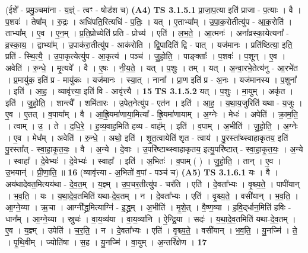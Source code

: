 \documentclass[17pt]{extarticle}
\begin{document}
                  \newline
                      (ईशे᳚ - प्रमु॒ञ्चमा॑ना - य॒ज्ञ्ं - त्वꣳ - षोड॑श च)  \textbf{(A4)} \newline \newline
                                \textbf{ TS 3.1.5.1} \newline
                  प्रा॒जा॒प॒त्या इति॑ प्राजा - प॒त्याः । वै । प॒शवः॑ । तेषा᳚म् । रु॒द्रः । अधि॑पति॒रित्यधि॑ - प॒तिः॒ । यत् । ए॒ताभ्या᳚म् । उ॒पा॒क॒रोतीत्यु॑प - आ॒क॒रोति॑ । ताभ्या᳚म् । ए॒व । ए॒न॒म् । प्र॒ति॒प्रोच्येति॑ प्रति - प्रोच्य॑ । एति॑ । ल॒भ॒ते॒ । आ॒त्मनः॑ । अना᳚व्रस्का॒येत्यना᳚ - व्र॒स्का॒य॒ । द्वाभ्या᳚म् । उ॒पाक॑रा॒तीत्यु॑प - आक॑रोति । द्वि॒पादिति॑ द्वि - पात् । यज॑मानः । प्रति॑ष्ठित्या॒ इति॒ प्रति॑ - स्थि॒त्यै॒ । उ॒पा॒कृत्येत्यु॑प - आ॒कृत्य॑ । पञ्च॑ । जु॒हो॒ति॒ । पाङ्क्ताः᳚ । प॒शवः॑ । प॒शून् । ए॒व । अवेति॑ । रु॒न्धे॒ । मृ॒त्यवे᳚ । वै । ए॒षः । नी॒य॒ते॒ । यत् । प॒शुः । तम् । यत् । अ॒न्वा॒रभे॒तेत्य॑नु - आ॒रभे॑त । प्र॒मायु॑क॒ इति॑ प्र - मायु॑कः । यज॑मानः । स्या॒त् । नाना᳚ । प्रा॒ण इति॑ प्र - अ॒नः । यज॑मानस्य । प॒शुना᳚ । इति॑ । आ॒ह॒ । व्यावृ॑त्त्या॒ इति॑ वि - आवृ॑त्त्यै । \textbf{  15} \newline
                  \newline
                                \textbf{ TS 3.1.5.2} \newline
                  यत् । प॒शुः । मा॒युम् । अकृ॑त । इति॑ । जु॒हो॒ति॒ । शान्त्यै᳚ । शमि॑तारः । उ॒पेत॒नेत्यु॑प - एत॑न । इति॑ । आ॒ह॒ । य॒था॒य॒जुरिति॑ यथा - य॒जुः । ए॒व । ए॒तत् । व॒पाया᳚म् । वै । आ॒ह्रि॒यमा॑णाया॒मित्या᳚ - ह्रि॒यमा॑णायाम् । अ॒ग्नेः । मेधः॑ । अपेति॑ । क्रा॒म॒ति॒ । त्वाम् । उ॒ । ते । द॒धि॒रे॒ । ह॒व्य॒वाह॒मिति॑ हव्य - वाह᳚म् । इति॑ । व॒पाम् । अ॒भीति॑ । जु॒हो॒ति॒ । अ॒ग्नेः । ए॒व । मेध᳚म् । अवेति॑ । रु॒न्धे॒ । अथो॒ इति॑ । शृ॒त॒त्वायेति॑ शृत - त्वाय॑ । पु॒रस्ता᳚थ्स्वाहाकृतय॒ इति॑ पु॒रस्ता᳚त् - स्वा॒हा॒कृ॒त॒यः॒ । वै । अ॒न्ये । दे॒वाः । उ॒परि॑ष्टाथ्स्वाहाकृतय॒ इत्यु॒परि॑ष्टात् - स्वा॒हा॒कृ॒त॒यः॒ । अ॒न्ये । स्वाहा᳚ । दे॒वेभ्यः॑ । दे॒वेभ्यः॑ । स्वाहा᳚ । इति॑ । अ॒भितः॑ । व॒पाम् ( ) । जु॒हो॒ति॒ । तान् । ए॒व । उ॒भयान्॑ । प्री॒णा॒ति॒ ॥ \textbf{  16 } \newline
                  \newline
                      (व्यावृ॑त्त्या - अ॒भितो॑ व॒पां - पञ्च॑ च)  \textbf{(A5)} \newline \newline
                                \textbf{ TS 3.1.6.1} \newline
                  यः । वै । अय॑थादेवत॒मित्यय॑था - दे॒व॒त॒म् । य॒ज्ञ्म् । उ॒प॒चर॒तीत्यु॑प - चर॑ति । एति॑ । दे॒वता᳚भ्यः । वृ॒श्च्य॒ते॒ । पापी॑यान् । भ॒व॒ति॒ । यः । य॒था॒दे॒व॒तमिति॑ यथा-दे॒व॒तम् । न । दे॒वता᳚भ्यः । एति॑ । वृ॒श्च्य॒ते॒ । वसी॑यान् । भ॒व॒ति॒ । आ॒ग्ने॒य्या । ऋ॒चा । आग्नी᳚द्ध्र॒मित्याग्नि॑ - इ॒द्ध्र॒म् । अ॒भीति॑ । मृ॒शे॒त् । वै॒ष्ण॒व्या । ह॒वि॒द्‌र्धान॒मिति॑ हविः - धान᳚म् । आ॒ग्ने॒य्या । स्रुचः॑ । वा॒य॒व्य॑या । वा॒य॒व्या॑नि । ऐ॒न्द्रि॒या । सदः॑ । य॒था॒दे॒व॒तमिति॑ यथा-दे॒व॒तम् । ए॒व । य॒ज्ञ्म् । उपेति॑ । च॒र॒ति॒ । न । दे॒वता᳚भ्यः । एति॑ । वृ॒श्च्य॒ते॒ । वसी॑यान् । भ॒व॒ति॒ । यु॒नज्मि॑ । ते॒ । पृ॒थि॒वीम् । ज्योति॑षा । स॒ह । यु॒नज्मि॑ । वा॒युम् । अ॒न्तरि॑क्षेण । \textbf{  17} \newline
\end{document}

